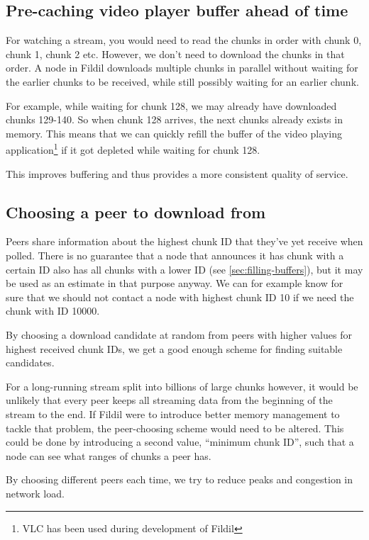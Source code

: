 \documentclass[10pt, a4paper]{article}
\begin{document}
\subsection{Pre-caching video player buffer ahead of time}
\label{sec:filling-buffers}

For watching a stream, you would need to read the chunks in order with chunk 0,
chunk 1, chunk 2 etc. However, we don't need to download the chunks in that
order. A node in Fildil downloads multiple chunks in parallel without waiting
for the earlier chunks to be received, while still possibly waiting for an
earlier chunk.

For example, while waiting for chunk 128, we may already have downloaded chunks
129-140. So when chunk 128 arrives, the next chunks already exists in
memory. This means that we can quickly refill the buffer of the video playing
application\footnote{VLC has been used during development of Fildil} if it got
depleted while waiting for chunk 128.

This improves buffering and thus provides a more consistent quality of service.

\subsection{Choosing a peer to download from}
\label{sec:choosing-peers}

Peers share information about the highest chunk ID that they've yet receive when
polled. There is no guarantee that a node that announces it has chunk with a
certain ID also has all chunks with a lower ID (see
\autoref{sec:filling-buffers}), but it may be used as an estimate in that
purpose anyway. We can for example know for sure that we should not contact a
node with highest chunk ID 10 if we need the chunk with ID 10000.

By choosing a download candidate at random from peers with higher values for
highest received chunk IDs, we get a good enough scheme for finding suitable
candidates.

For a long-running stream split into billions of large chunks however, it would
be unlikely that every peer keeps all streaming data from the beginning of the
stream to the end. If Fildil were to introduce better memory management to
tackle that problem, the peer-choosing scheme would need to be altered. This
could be done by introducing a second value, ``minimum chunk ID'', such that a
node can see what ranges of chunks a peer has.

By choosing different peers each time, we try to reduce peaks and congestion in
network load.
\end{document}
